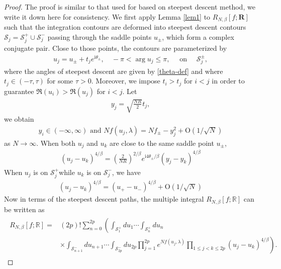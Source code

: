 \documentclass[11pt,a4paper]{article}
\numberwithin{equation}{section} %
\theoremstyle{plain}
\theoremstyle{definition}
\numberwithin{prop}{section}
\numberwithin{cor}{section}
\numberwithin{remark}{section}
\begin{document}
\begin{proof}
The proof is similar to that used for \cite[Proposition 2]{DF06} based on steepest descent method, we write it down here for consistency. We first apply Lemma \ref{lem1} to $R_{N,\beta}[f;\mathbf{R}]$ such that the integration contours are deformed into steepest descent contours $\mathcal{S}_j=\mathcal{S}_j^+\cup \mathcal{S}_j^-$ passing through the saddle points $u_\pm$, which form a complex conjugate pair. Close to those points, the contours are parameterized by 
\begin{align*}
    u_j=u_{ \pm}+t_j e^{\mathrm{i} \theta_{ \pm}}, \quad-\pi<\arg u_j \leqslant \pi, \quad \text { on } \quad \mathcal{S}_j^{ \pm},
\end{align*}
	where the angles of steepest descent are given by \eqref{theta-def} and where $t_j\in(-\tau,\tau) $ for some $\tau>0$. Moreover, we impose $t_i>t_j$ for $i<j$ in order to guarantee $\mathfrak{R}\left(u_i\right)>\mathfrak{R}\left(u_j\right)$ for $i<j$. Let 
\begin{align*}
    y_j=\sqrt{\frac{N R}{2}} t_j,
\end{align*}
we obtain
\begin{align*}
    y_i\in (-\infty,\infty)\text{ and } Nf(u_j,\lambda)=Nf_\pm-y^2_j+\mathrm{O}(1/\sqrt{N})
\end{align*}
as $N\to \infty$. When both $u_j$ and $u_k$ are close to the same saddle point $u_{ \pm}$,
\begin{align*}
    \left(u_j-u_k\right)^{4 / \beta}=\left(\frac{2}{N R}\right)^{2 / \beta} e^{\mathrm{i} 4 \theta_{ \pm} / \beta}\left(y_j-y_k\right)^{4 / \beta}
\end{align*}
When $u_j$ is on $\mathcal{S}_j^{+}$while $u_k$ is on $\mathcal{S}_j^{-}$, we have
\begin{align*}
    \left(u_j-u_k\right)^{4 / \beta}=\left(u_{+}-u_{-}\right)^{4 / \beta}+\mathrm{O}(1 / \sqrt{N})
\end{align*}
Now in terms of the steepest descent paths, the multiple integral $R_{N,\beta}[f;\mathbb{R}]$ can be written as 
\begin{align*}
    \begin{aligned}
R_{N, \beta}[f;\mathbb{R}]= & (2p)!\sum_{n=0}^{2p}\left(\int_{\mathcal{S}_1^{+}} d u_1 \cdots \int_{\mathcal{S}_n^{+}} d u_n\right. \\
& \left.\times \int_{\mathcal{S}_{n+1}^{-}} d u_{n+1} \cdots \int_{\mathcal{S}_{2p}^{-}} d u_{2p} \prod_{j=1}^{2p} e^{N f\left(u_j,\lambda\right)} \prod_{1 \leqslant j<k \leqslant 2p}\left(u_j-u_k\right)^{4 / \beta}\right) .

\end{aligned}
\end{align*}
\end{proof}
\end{document}
